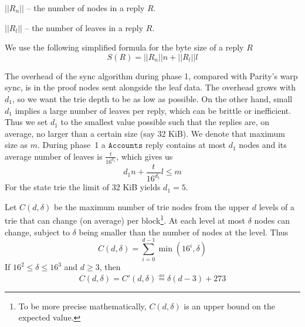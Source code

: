 \documentclass{amsart}
\begin{document}
$||R_n||$ -- the number of nodes in a reply $R$.

$||R_l||$ -- the number of leaves in a reply $R$.

We use the following simplified formula for the byte size of a reply $R$
\begin{equation}
    S(R) = ||R_n|| n + ||R_l|| l
\end{equation}

The overhead of the sync algorithm during phase 1, compared with Parity's warp sync, is in the proof nodes sent alongside the leaf data.
The overhead grows with $d_1$, so we want the trie depth to be as low as possible.
On the other hand, small $d_1$ implies a large number of leaves per reply, which can be brittle or inefficient.
Thus we set $d_1$ to the smallest value possible such that the replies are, on average, no larger than a certain size (say 32 KiB).
We denote that maximum size as $m$.
During phase~1 a $\texttt{Accounts}$ reply contains at most $d_1$ nodes
and its average number of leaves is $\frac{t}{16^{d_1}}$,
which gives us
\begin{equation}
    d_1 n + \frac{t}{16^{d_1}} l \leq m
\end{equation}
For the state trie the limit of 32 KiB yields $d_1 = 5$.

Let $C(d, \delta)$ be the maximum number of trie nodes from the upper $d$ levels of a trie that can change (on average) per block\footnote{To
be more precise mathematically, $C(d, \delta)$ is an upper bound on the expected value.}.
At each level at most $\delta$ nodes can change, subject to $\delta$ being smaller than the number of nodes at the level.
Thus
\begin{equation}
    C(d, \delta) = \sum_{i=0}^{d-1} \min(16^i, \delta)
\end{equation}
If $16^2 \leq \delta \leq 16^3$ and $d \geq 3$, then
\begin{equation}
    C(d, \delta) = C'(d, \delta) \overset{\underset{\mathrm{def}}{}}{=}
     \delta (d-3) + 273
\end{equation}
\end{document}
